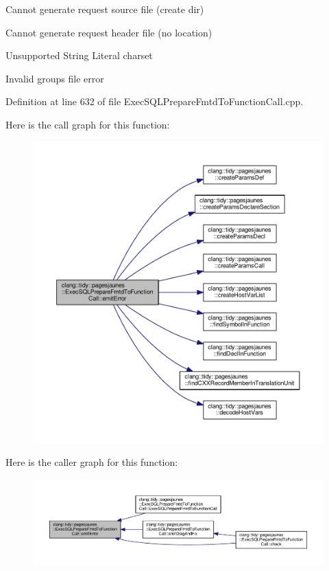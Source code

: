 Cannot generate request source file (create dir)

Cannot generate request header file (no location)

Unsupported String Literal charset

Invalid groups file error 

Definition at line 632 of file Exec\+S\+Q\+L\+Prepare\+Fmtd\+To\+Function\+Call.\+cpp.

Here is the call graph for this function\+:
\nopagebreak
\begin{figure}[H]
\begin{center}
\leavevmode
\includegraphics[width=350pt]{classclang_1_1tidy_1_1pagesjaunes_1_1_exec_s_q_l_prepare_fmtd_to_function_call_af3eaf79180a774629667e46f74960c7f_cgraph}
\end{center}
\end{figure}
Here is the caller graph for this function\+:
\nopagebreak
\begin{figure}[H]
\begin{center}
\leavevmode
\includegraphics[width=350pt]{classclang_1_1tidy_1_1pagesjaunes_1_1_exec_s_q_l_prepare_fmtd_to_function_call_af3eaf79180a774629667e46f74960c7f_icgraph}
\end{center}
\end{figure}
